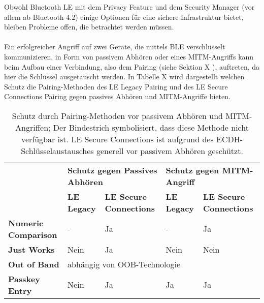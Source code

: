 Obwohl Bluetooth LE mit dem Privacy Feature und dem Security Manager (vor allem ab Bluetooth 4.2) einige Optionen für eine sichere Infrastruktur bietet, bleiben Probleme offen, die betrachtet werden müssen.
\\\\
Ein erfolgreicher Angriff auf zwei Geräte, die mittels BLE verschlüsselt kommunizieren, in Form von passivem Abhören oder eines MITM-Angriffs kann beim Aufbau einer Verbindung, also dem Pairing (siehe Sektion X 
), auftreten, da hier die Schlüssel ausgetauscht werden. In Tabelle X 
wird dargestellt welchen Schutz die Pairing-Methoden des LE Legacy Pairing und des LE Secure Connections Pairing gegen passives Abhören und MITM-Angriffe bieten.

\begin{table}
    \begin{tabularx}{\textwidth}{|p{2.8cm}|p{2cm}|p{3cm}|p{2cm}|p{3cm}|}
        \hline
        & \multicolumn{2}{X|}{\textbf{Schutz gegen Passives Abhören}} & \multicolumn{2}{X|}{\textbf{Schutz gegen MITM-Angriff}} \\
        & \textbf{LE Legacy} & \textbf{LE Secure Connections} & \textbf{LE Legacy} & \textbf{LE Secure Connections} \\
        \hline
        \textbf{Numeric Comparison} & - & Ja & - & Ja \cite{BtSpec4.2_2309} \\
        \hline
        \textbf{Just Works} & Nein \cite{BtSpec4.2_2304_b} & Ja \cite{BtSpec4.2_245} & Nein \cite{BtSpec4.2_2304_b} & Nein \cite{BtSpec4.2_245} \\
        \hline
        \textbf{Out of Band} & \multicolumn{4}{|l|}{abhängig von OOB-Technologie \cite{BtSpec4.2_2305} \cite{BtSpec4.2_2312-2313}} \\
        \hline
        \textbf{Passkey Entry} & Nein \cite{BtSpec4.2_2304} & Ja & Ja \cite{BtSpec4.2_2304} & Ja \cite{BtSpec4.2_2311}\\
        \hline
    \end{tabularx}
    \caption[Schutz durch Pairing-Methoden vor passivem Abhören und MITM]{Schutz durch Pairing-Methoden vor passivem Abhören und MITM-Angriffen; Der Bindestrich symbolisiert, dass diese Methode nicht verfügbar ist. LE Secure Connections ist aufgrund des ECDH-Schlüsselaustausches \cite{BtSpec4.2_2307} generell vor passivem Abhören geschützt.}
\end{table}


